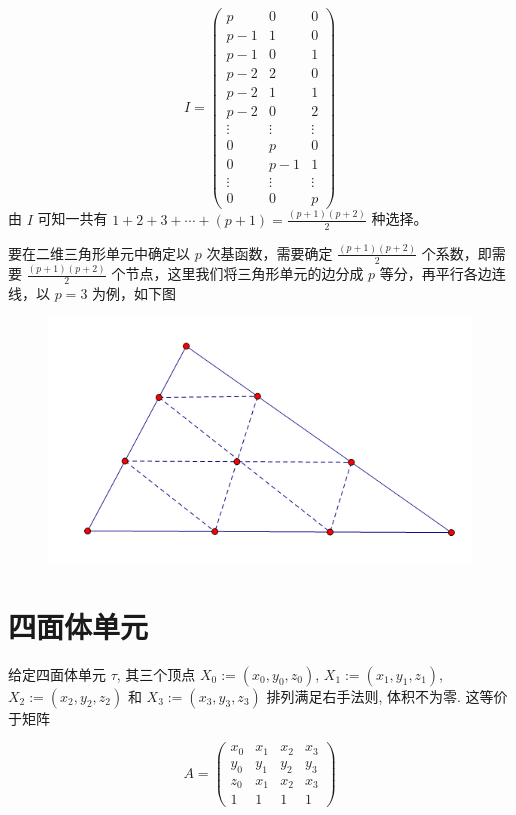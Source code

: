 \documentclass[12pt,a4paper]{article}
\begin{document}
$$
I = \begin{pmatrix}
p & 0 & 0 \\
p-1 & 1 & 0 \\
p-1 & 0 & 1 \\
p-2 & 2 & 0 \\
p-2 & 1 & 1 \\
p-2 & 0 & 2 \\
\vdots & \vdots & \vdots \\
0   & p & 0 \\
0   & p-1 & 1\\
\vdots & \vdots & \vdots \\
0   & 0  & p
\end{pmatrix}
$$
由 $I$ 可知一共有 $1+2+3+\cdots+(p+1)=\frac{(p+1)(p+2)}{2}$ 种选择。

要在二维三角形单元中确定以 $p$ 次基函数，需要确定 $\frac{(p+1)(p+2)}{2}$ 个系数，即需要 $\frac{(p+1)(p+2)}{2}$ 个节点，这里我们将三角形单元的边分成 $p$ 等分，再平行各边连线，以 $p=3$ 为例，如下图
\begin{figure}[H]
\centering
\includegraphics[scale=0.7]{./figures/4.png}
\caption{}
\end{figure}



\section{四面体单元}
给定四面体单元 $\tau$, 其三个顶点 $X_0 :=(x_0, y_0,z_0)$, $X_1 :=(x_1,y_1,z_1)$, $X_2 :=(x_2,y_2,z_2)$ 和 $X_3 :=(x_3, y_3, z_3)$ 排列满足右手法则, 体积不为零. 这等价于矩阵

$$
A = 
\begin{pmatrix}
x_0 & x_1 & x_2 & x_3\\
y_0 & y_1 & y_2 & y_3\\
z_0 & x_1 & x_2 & x_3\\
1   & 1   & 1 & 1
\end{pmatrix}
$$
\end{document}
